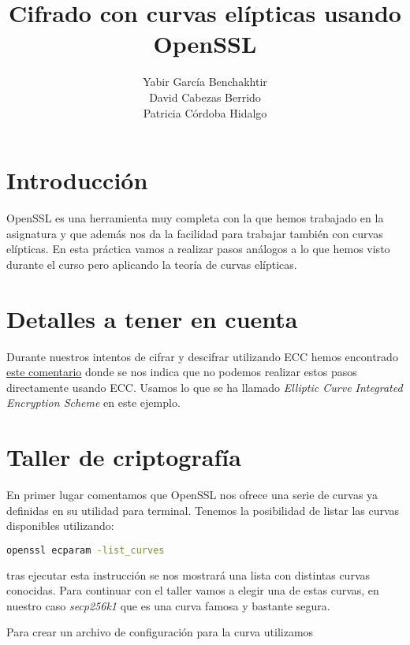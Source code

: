 \documentclass{article}
\begin{document}
\title{\Huge \textbf{Cifrado con curvas elípticas usando OpenSSL}} \author{Yabir
García Benchakhtir\\ David Cabezas Berrido\\ Patricia Córdoba Hidalgo
} \date{}
\maketitle

\section{Introducción}

OpenSSL es una herramienta muy completa con la que hemos trabajado en la
asignatura y que además nos da la facilidad para trabajar también con curvas
elípticas. En esta práctica vamos a realizar pasos análogos a lo que hemos visto
durante el curso pero aplicando la teoría de curvas elípticas. 

\section{Detalles a tener en cuenta}

Durante nuestros intentos de cifrar y descifrar utilizando ECC hemos encontrado
\href{https://stackoverflow.com/a/58942471/2588566}{este comentario} donde se
nos indica que no podemos realizar estos pasos directamente usando ECC. Usamos
lo que se ha llamado \textit{Elliptic Curve Integrated Encryption Scheme} en
este ejemplo.

\section{Taller de criptografía}

En primer lugar comentamos que OpenSSL nos ofrece una serie de curvas ya
definidas en su utilidad para terminal. Tenemos la posibilidad de listar las
curvas disponibles utilizando:

\begin{lstlisting}[language=bash]
  openssl ecparam -list_curves
\end{lstlisting}

tras ejecutar esta instrucción se nos mostrará una lista con distintas curvas
conocidas. Para continuar con el taller vamos a elegir una de estas curvas,
en nuestro caso \textit{secp256k1} que es una curva famosa y bastante segura.

Para crear un archivo de configuración para la curva utilizamos 
\end{document}
